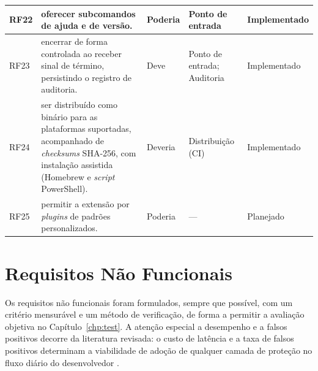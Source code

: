 {\begin{longtable}{|p{1.15cm}|p{7.6cm}|p{1.7cm}|p{2.2cm}|p{2.0cm}|}
RF22 & oferecer subcomandos de ajuda e de versão. & Poderia & Ponto de entrada & Implementado \\ \hline
RF23 & encerrar de forma controlada ao receber sinal de término, persistindo o registro de auditoria. & Deve & Ponto de entrada; Auditoria & Implementado \\ \hline
RF24 & ser distribuído como binário para as plataformas suportadas, acompanhado de \textit{checksums} SHA-256, com instalação assistida (Homebrew e \textit{script} PowerShell). & Deveria & Distribuição (CI) & Implementado \\ \hline
RF25 & permitir a extensão por \textit{plugins} de padrões personalizados. & Poderia & --- & Planejado \\ \hline
\end{longtable}
}
\noindent{}


\section{Requisitos Não Funcionais}
\label{sec:req_rnf}

Os requisitos não funcionais foram formulados, sempre que possível, com um critério mensurável e um método de verificação, de forma a permitir a avaliação objetiva no Capítulo~\ref{chp:test}. A atenção especial a desempenho e a falsos positivos decorre da literatura revisada: o custo de latência e a taxa de falsos positivos determinam a viabilidade de adoção de qualquer camada de proteção no fluxo diário do desenvolvedor \cite{tsebak2025enhancing}.

